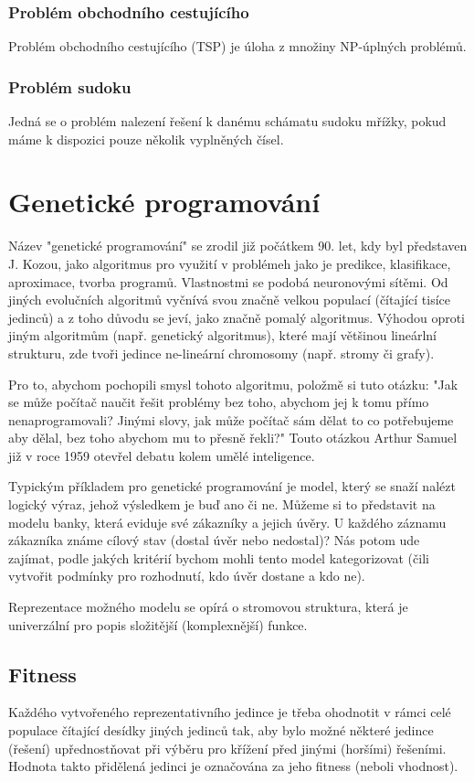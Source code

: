 \documentclass[bc,male,java,dept460]{diploma}		%
\begin{document}
\subsubsection{Problém obchodního cestujícího}
Problém obchodního cestujícího (TSP) je úloha z množiny NP-úplných problémů.

\subsubsection{Problém sudoku}
Jedná se o problém nalezení řešení k danému schámatu sudoku mřížky, pokud máme k dispozici pouze několik vyplněných čísel.


\section{Genetické programování}
Název "genetické programování" se zrodil již počátkem 90. let, kdy byl představen J. Kozou, jako algoritmus pro využití v problémeh jako je predikce, klasifikace, aproximace, tvorba programů.
Vlastnostmi se podobá neuronovými sítěmi. Od jiných evolučních algoritmů vyčnívá svou značně velkou populací (čítající tisíce jedinců) a z toho důvodu se jeví, jako značně pomalý algoritmus.
Výhodou oproti jiným algoritmům (např. genetický algoritmus), které mají většinou lineárlní strukturu, zde tvoři jedince ne-lineární chromosomy (např. stromy či grafy).

Pro to, abychom pochopili smysl tohoto algoritmu, položmě si tuto otázku: "Jak se může počítač naučit řešit  problémy bez toho, abychom jej k tomu přímo nenaprogramovali? Jinými slovy, jak může počítač sám dělat to co potřebujeme aby dělal, bez toho abychom mu to přesně řekli?" Touto otázkou Arthur Samuel již v roce 1959 otevřel debatu kolem umělé inteligence.

Typickým příkladem pro genetické programování je model, který se snaží nalézt logický výraz, jehož výsledkem je buď ano či ne. Můžeme si to představit na modelu banky, která eviduje své zákazníky a jejich úvěry. U každého záznamu zákazníka známe cílový stav (dostal úvěr nebo nedostal)? Nás potom ude zajímat, podle jakých kritérií bychom mohli tento model kategorizovat (čili vytvořit podmínky pro rozhodnutí, kdo úvěr dostane a kdo ne).

Reprezentace možného modelu se opírá o stromovou struktura, která je univerzální pro popis složitější (komplexnější) funkce.
\subsection{Fitness}
Každého vytvořeného reprezentativního jedince je třeba ohodnotit v rámci celé populace čítající desídky jiných jedinců tak, aby bylo možné některé jedince (řešení) upřednostňovat při výběru pro křížení před jinými (horšími) řešeními.
Hodnota takto přidělená jedinci je označována za jeho fitness (neboli vhodnost).
\end{document}
